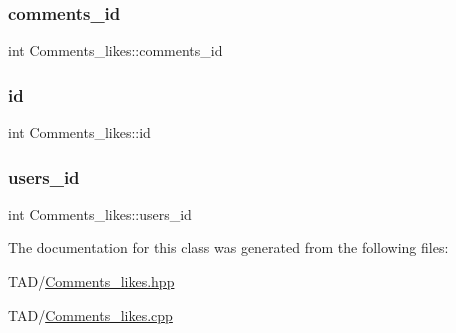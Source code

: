 \subsubsection{\texorpdfstring{comments\+\_\+id}{comments\_id}}
{\footnotesize\ttfamily int Comments\+\_\+likes\+::comments\+\_\+id\hspace{0.3cm}{\ttfamily [private]}}

\mbox{\label{class_comments__likes_a84dd42c2fa62720dd82af70e82b1c842}} 
\subsubsection{\texorpdfstring{id}{id}}
{\footnotesize\ttfamily int Comments\+\_\+likes\+::id\hspace{0.3cm}{\ttfamily [private]}}

\mbox{\label{class_comments__likes_a5d67f819db937fc4e7cd66181f97d80e}} 
\subsubsection{\texorpdfstring{users\+\_\+id}{users\_id}}
{\footnotesize\ttfamily int Comments\+\_\+likes\+::users\+\_\+id\hspace{0.3cm}{\ttfamily [private]}}



The documentation for this class was generated from the following files\+:\begin{DoxyCompactItemize}
\item 
T\+A\+D/\hyperlink{_comments__likes_8hpp}{Comments\+\_\+likes.\+hpp}\item 
T\+A\+D/\hyperlink{_comments__likes_8cpp}{Comments\+\_\+likes.\+cpp}\end{DoxyCompactItemize}
